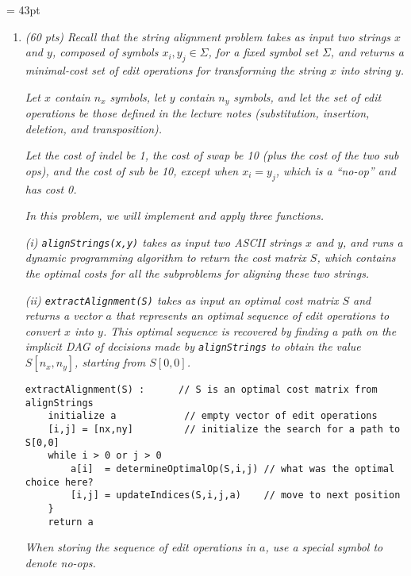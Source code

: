\documentclass[12pt]{article}
\begin{document}
\renewcommand{\headrulewidth}{0.4pt}
\headheight = 43pt

\renewcommand{\arraystretch}{1.5}

\vspace{-3mm}
\begin{enumerate}
		 
		\item \textit{(60 pts) Recall that the \textit{string alignment problem} takes as input two strings $x$ and $y$, composed of symbols $x_{i},y_{j}\in \Sigma$, for a fixed symbol set $\Sigma$, and returns a minimal-cost set of \textit{edit} operations for transforming the string $x$ into string $y$.}
	
	    \textit{Let $x$ contain $n_{x}$ symbols, let $y$ contain $n_{y}$ symbols, and let the set of edit operations be those defined in the lecture notes (substitution, insertion, deletion, and transposition).}
	
	    \textit{Let the cost of \textit{indel} be 1, the cost of \textit{swap} be 10 (plus the cost of the two \textit{sub} ops), and the cost of \textit{sub} be 10, except when $x_{i}=y_{j}$, which is a ``no-op'' and has cost 0.}
	
	    \textit{In this problem, we will implement and apply three functions.}
	
	    \textit{(i) {\tt alignStrings(x,y)} takes as input two ASCII strings $x$ and $y$, and runs a dynamic programming algorithm to return the cost matrix $S$, which contains the optimal costs for all the subproblems for aligning these two strings.}
	
	    \textit{(ii) {\tt extractAlignment(S)} takes as input an optimal cost matrix $S$ and returns a vector $a$ that represents an optimal sequence of edit operations to convert $x$ into $y$. This optimal sequence is recovered by finding a path on the implicit DAG of decisions made by {\tt alignStrings} to obtain the value $S[n_{x},n_{y}]$, starting from $S[0,0]$. }
		
    	\begin{small}
    	\begin{verbatim}
extractAlignment(S) :      // S is an optimal cost matrix from alignStrings
    initialize a            // empty vector of edit operations
    [i,j] = [nx,ny]         // initialize the search for a path to S[0,0]
    while i > 0 or j > 0
        a[i]  = determineOptimalOp(S,i,j) // what was the optimal choice here?
        [i,j] = updateIndices(S,i,j,a)    // move to next position
    }
    return a
    	\end{verbatim}
    	\end{small}
    	\textit{When storing the sequence of edit operations in $a$, use a special symbol to denote no-ops.}
	

\end{enumerate}
\end{document}
